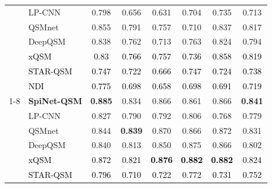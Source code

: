 \documentclass[sn-vancouver,Numbered]{sn-jnl}%
\begin{document}
\begin{table}[htbp]
{\begin{tabular}{llcccccc}
& LP-CNN                
&0.798
&0.656
&0.631
&0.704
&0.735
&0.713\\ 

& QSMnet                
&0.855
&0.791
&0.757
&0.710
&0.837
&0.817\\ 

& DeepQSM               
&0.838
&0.762
&0.713
&0.763
&0.824
&0.794 \\ 

&\textcolor{black}{xQSM}               
&\textcolor{black}{0.83}
&\textcolor{black}{0.766}
&\textcolor{black}{0.757}
&\textcolor{black}{0.736}
&\textcolor{black}{0.858}
&\textcolor{black}{0.819}\\ 


&\textcolor{black}{STAR-QSM}               
&\textcolor{black}{0.747}
&\textcolor{black}{0.722}
&\textcolor{black}{0.666}
&\textcolor{black}{0.747}
&\textcolor{black}{0.724}
&\textcolor{black}{0.738}\\ 


&\textcolor{black}{NDI}               
&\textcolor{black}{0.775}
&\textcolor{black}{0.698}
&\textcolor{black}{0.658}
&\textcolor{black}{0.698}
&\textcolor{black}{0.691}
&\textcolor{black}{0.719}\\ 













\cmidrule{1-8}


\multirow{5}{*}{PUT}        
& \textbf{SpiNet-QSM}   
&\textbf{0.885}
&0.834
&0.866
& 0.861
& 0.866
&\textbf{0.841} \\ 


& LP-CNN                
&0.827
&0.790
&0.792
&0.806
&0.768
&0.779\\ 


& QSMnet                
&0.844
&\textbf{0.839}
&0.870
&0.866
&0.872
&0.831\\ 


& DeepQSM               
&0.840
&0.813
&0.850
&0.875
&0.866
&0.802 \\ 

&\textcolor{black}{xQSM}               
&\textcolor{black}{0.872}
&\textcolor{black}{0.821}
&\textcolor{black}{\textbf{0.876}}
&\textcolor{black}{\textbf{0.882}}
&\textcolor{black}{\textbf{0.882}}
&\textcolor{black}{0.824}\\

&\textcolor{black}{STAR-QSM}               
&\textcolor{black}{0.796}
&\textcolor{black}{0.710}
&\textcolor{black}{0.722}
&\textcolor{black}{0.772}
&\textcolor{black}{0.731}
&\textcolor{black}{0.752}\\ 


\end{tabular}}
\end{table}
\end{document}
